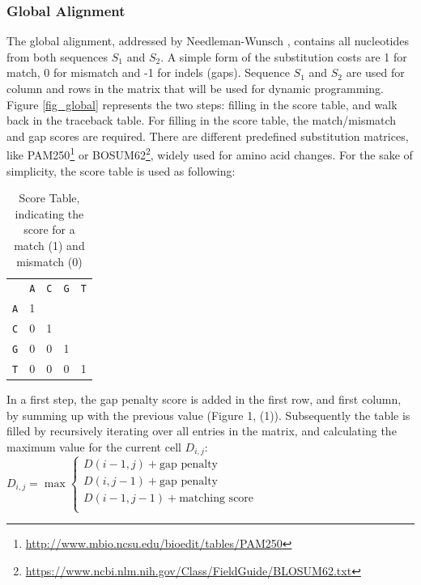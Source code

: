 \subsubsection{Global Alignment}
The global alignment, addressed by Needleman-Wunsch \cite{Needleman1970}, contains all nucleotides from both sequences $S_1$ and $S_2$. A simple form of the substitution costs are 1 for match, 0 for mismatch and -1 for indels (gaps). Sequence $S_1$ and $S_2$ are used for column and rows in the matrix that will be used for dynamic programming. Figure \ref{fig_global} represents the two steps: filling in the score table, and walk back in the traceback table. For filling in the score table, the match/mismatch and gap scores are required. There are different predefined substitution matrices, like PAM250\footnote{\url{http://www.mbio.ncsu.edu/bioedit/tables/PAM250}} or BOSUM62\footnote{\url{https://www.ncbi.nlm.nih.gov/Class/FieldGuide/BLOSUM62.txt}}, widely used for amino acid changes. For the sake of simplicity, the score table is used as following:
\begin{table}[]
\centering
\caption{Score Table, indicating the score for a match (1) and mismatch (0)}
\label{scoreTable}
\begin{tabular}{lllll}
  & \texttt{A} & \texttt{C} & \texttt{G} & \texttt{T} \\
 \texttt{A} & \cellcolor[HTML]{808000}1 &   &   &   \\
\texttt{C} & 0 & \cellcolor[HTML]{808000}1 &   &   \\
\texttt{G} & 0 & 0 & \cellcolor[HTML]{808000}1 &   \\
\texttt{T} & 0 & 0 & 0 & \cellcolor[HTML]{808000}1
\end{tabular}
\end{table}
In a first step, the gap penalty score is added in the first row, and first column, by summing up with the previous value (Figure 1, (1)). Subsequently the table is filled by recursively iterating over all entries in the matrix, and calculating the maximum value for the current cell $D_{i,j}$:
$ D_{i,j} = \max
  \begin{cases}
    D(i-1,j)+ \text{gap penalty}      \\
    D(i,j-1)+ \text{gap penalty} \\
    D(i-1,j-1)+ \text{matching score} \\
  \end{cases}
$
